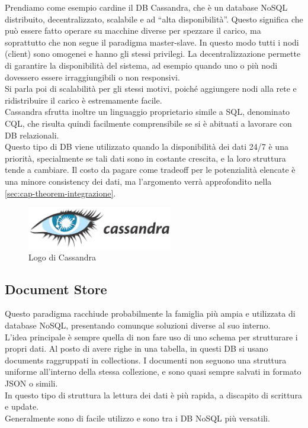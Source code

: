 \noindent Prendiamo come esempio cardine il DB Cassandra, che è un database NoSQL distribuito, decentralizzato, scalabile e ad ``alta disponibilità''. Questo significa che può essere fatto operare su macchine diverse per spezzare il carico, ma soprattutto che non segue il paradigma master-slave. In questo modo tutti i nodi (client) sono omogenei e hanno gli stessi privilegi. La decentralizzazione permette di garantire la disponibilità del sistema, ad esempio quando uno o più nodi dovessero essere irraggiungibili o non responsivi.\\
Si parla poi di scalabilità per gli stessi motivi, poiché aggiungere nodi alla rete e ridistribuire il carico è estremamente facile.\\
Cassandra sfrutta inoltre un linguaggio proprietario simile a SQL, denominato CQL, che risulta quindi facilmente comprensibile se si è abituati a lavorare con DB relazionali.\\

\noindent Questo tipo di DB viene utilizzato quando la disponibilità dei dati 24/7 è una priorità, specialmente se tali dati sono in costante crescita, e la loro struttura tende a cambiare. Il costo da pagare come tradeoff per le potenzialità elencate è una minore consistency dei dati, ma l'argomento verrà approfondito nella \autoref{sec:cap-theorem-integrazione}.

\begin{figure}[htbp]
\begin{center}
\includegraphics[height=5em]{immagini/tecnologies-logos/Cassandra-Logo-h.png}
\caption{Logo di Cassandra}
\end{center}
\end{figure}

\subsection{Document Store}
Questo paradigma racchiude probabilmente la famiglia più ampia e utilizzata di database NoSQL, presentando comunque soluzioni diverse al suo interno.\\
L'idea principale è sempre quella di non fare uso di uno schema per strutturare i propri dati. Al posto di avere righe in una tabella, in questi DB si usano documents raggruppati in collections. I documenti non seguono una struttura uniforme all'interno della stessa collezione, e sono quasi sempre salvati in formato JSON o simili.\\
In questo tipo di struttura la lettura dei dati è più rapida, a discapito di scrittura e update.\\
Generalmente sono di facile utilizzo e sono tra i DB NoSQL più versatili.\\

